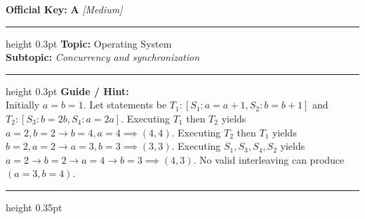 \documentclass[a4paper,10pt]{article}
\begin{document}
\begin{tcolorbox}
\textbf{Official Key:} \textbf{\large A} \hfill \textit{\small [Medium]}
\vspace{2pt}\hrule height 0.3pt\vspace{3pt}
\textbf{Topic:} Operating System \\
\textbf{Subtopic:} \textit{Concurrency and synchronization}
\vspace{2pt}\hrule height 0.3pt\vspace{3pt}
\textbf{Guide / Hint:} \\
{\small Initially $a=b=1$. Let statements be $T_1: [S_1: a=a+1, S_2: b=b+1]$ and $T_2: [S_3: b=2b, S_4: a=2a]$. Executing $T_1$ then $T_2$ yields $a=2, b=2 \to b=4, a=4 \implies (4, 4)$. Executing $T_2$ then $T_1$ yields $b=2, a=2 \to a=3, b=3 \implies (3, 3)$. Executing $S_1, S_3, S_4, S_2$ yields $a=2 \to b=2 \to a=4 \to b=3 \implies (4, 3)$. No valid interleaving can produce $(a=3, b=4)$.}

\end{tcolorbox}
\vspace{6pt}\hrule height 0.35pt\vspace{6pt}
\noindent
\end{document}
